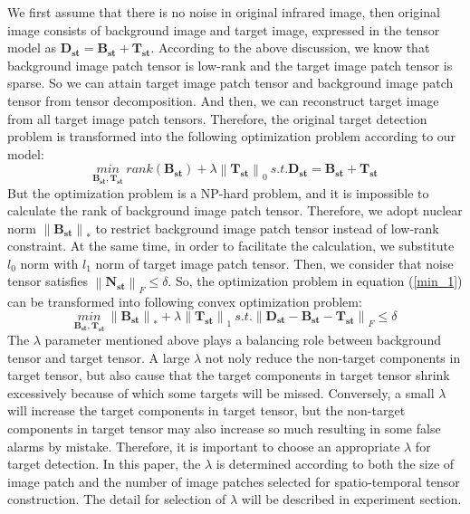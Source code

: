\documentclass[journal]{IEEEtran}
\begin{document}
We first assume that there is no noise in original infrared image, then original image consists of background image and target image, expressed in the tensor model as $\bm{D_{st}}=\bm{B_{st}}+\bm{T_{st}}$. According to the above discussion, we know that background image patch tensor is low-rank and the target image patch tensor is sparse. So we can attain target image patch tensor and background image patch tensor from tensor decomposition. And then, we can reconstruct target image from all target image patch tensors. Therefore, the original target detection problem is transformed into the following optimization problem according to our model:
\begin{equation}
  \underset{\bm{B_{st}},\bm{T_{st}}}{min} \ rank(\bm{B_{st}}) + \lambda \left \| \bm{T_{st}} \right \|_0 \ s.t. \bm{D_{st}}=\bm{B_{st}}+\bm{T_{st}}
  \label{min_1}
\end{equation}
But the optimization problem is a NP-hard problem, and it is impossible to calculate the rank of background image patch tensor. Therefore, we adopt nuclear norm $\left \| \bm{B_{st}} \right \|_*$ to restrict background image patch tensor instead of low-rank constraint. At the same time, in order to facilitate the calculation, we substitute $l_0$ norm with $l_1$ norm of target image patch tensor. Then, we consider that noise tensor satisfies $\left \| \bm{N_{st}}\right \|_F \leq \delta$. So, the optimization problem in equation (\ref{min_1}) can be transformed into following convex optimization problem:
\begin{equation}
  \underset{\bm{B_{st}},\bm{T_{st}}}{min} \ \left \| \bm{B_{st}} \right \|_* + \lambda \left \| \bm{T_{st}} \right \|_1 \ s.t. \left \|\bm{D_{st}}-\bm{B_{st}}-\bm{T_{st}} \right \|_F\leq \delta
  \label{min_2}
\end{equation}
The $\lambda$ parameter mentioned above plays a balancing role between background tensor and target tensor. A large $\lambda$ not noly reduce the non-target components in target tensor, but also cause that the target components in target tensor shrink excessively because of which some targets will be missed. Conversely, a small $\lambda$ will increase the target components in target tensor, but the non-target components in target tensor may also increase so much resulting in some false alarms by mistake. Therefore, it is important to choose an appropriate $\lambda$ for target detection. In this paper, the $\lambda$ is determined according to both the size of image patch and the number of image patches selected for spatio-temporal tensor construction. The detail for selection of $\lambda$ will be described in experiment section.
\end{document}
